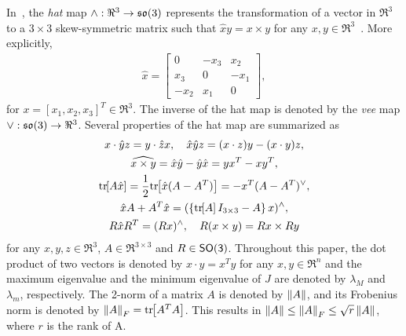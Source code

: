 \documentclass[letterpaper, 10 pt, conference]{ieeeconf}  %
\begin{document}
In~, the \textit{hat} map $\wedge :\Re^{3}\rightarrow\mathfrak{so}(3)$ represents the transformation of a vector in $\Re^3$ to a $3\times 3$ skew-symmetric matrix such that $\hat x y = x\times y$ for any $x,y\in\Re^3$~\cite{BulLew05}. More explicitly, 
\begin{align*}
\hat x = \begin{bmatrix} 0 & -x_3 & x_2 \\ x_3 & 0 & -x_1 \\ -x_2 & x_1 & 0\end{bmatrix},
\end{align*}
for $x=[x_1,x_2,x_3]^T\in\Re^3$. 
The inverse of the hat map is denoted by the \textit{vee} map $\vee:\mathfrak{so}(3)\rightarrow\Re^3$. Several properties of the hat map are summarized as
\begin{gather}
    x\cdot \hat y z = y\cdot \hat z x,\quad \hat x\hat y z = (x\cdot z) y - (x\cdot y ) z\label{eqn:STP},\\
    \widehat{x\times y} = \hat x \hat y -\hat y \hat x = yx^T-xy^T,\label{eqn:hatxy}\\
    \mathrm{tr}\negthickspace\left[ A\hat x  \right]=\frac{1}{2}\mathrm{tr}\negthickspace\left[ \hat x (A-A^T) \right]=-x^T (A-A^T)^\vee,\label{eqn:hat1}\\
    \hat x  A+A^T\hat x=(\left\{ \mathrm{tr}\negthickspace\left[ A \right]I_{3\times 3}-A \right\}x)^{\wedge},\label{eqn:xAAx}\\
R\hat x R^T = (Rx)^\wedge,\quad 
R(x\times y) = Rx\times Ry\label{eqn:RxR}
\end{gather}
for any $x,y,z\in\Re^3$, $A\in\Re^{3\times 3}$ and $R\in\mathsf{SO(3)}$. 
Throughout this paper, the dot product of two vectors is denoted by $x\cdot y = x^T y$ for any $x,y\in\Re^n$ and the maximum eigenvalue and the minimum eigenvalue of $J$ are denoted by $\lambda_M$ and $\lambda_m$, respectively. 
The 2-norm of a matrix \( A \) is denoted by \( \left\| A \right\| \), and its Frobenius norm is denoted by \( \left\| A \right\|_F = \mathrm{tr}\negthickspace\left[ A^T A \right] \).
This results in \( \left\| A \right\| \leq \left\| A \right\|_F \leq \sqrt{r}\left\| A \right\| \), where \( r \) is the rank of A.
\end{document}
